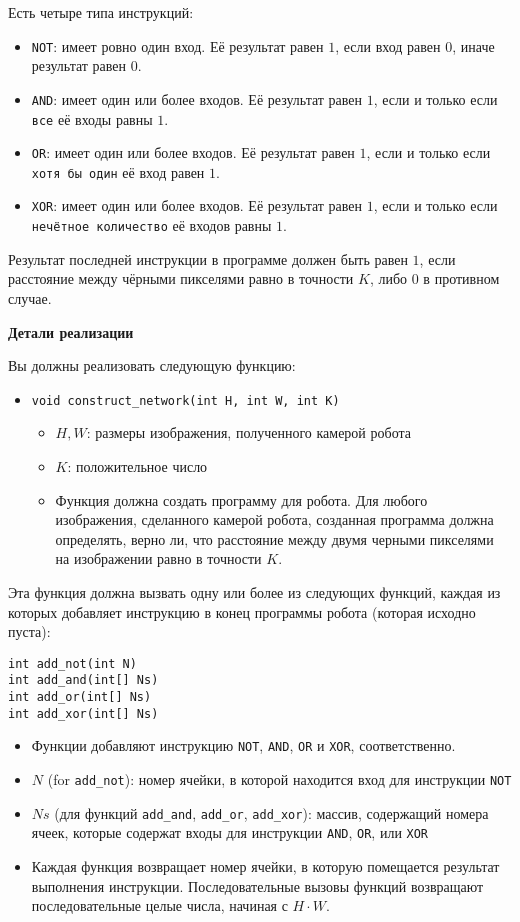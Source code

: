 Есть четыре типа инструкций:
\begin{itemize}
\item \texttt{NOT}: имеет ровно один вход. Её результат равен $1$, если вход равен $0$, иначе результат равен $0$.
\item \texttt{AND}: имеет один или более входов. Её результат равен $1$, если и только если \texttt{все} её входы равны $1$.
\item \texttt{OR}: имеет один или более входов. Её результат равен $1$, если и только если
\texttt{хотя бы один} её вход равен $1$.
\item \texttt{XOR}: имеет один или более входов. Её результат равен $1$, если и только если \texttt{нечётное количество} её входов равны $1$.
\end{itemize}

Результат последней инструкции в программе должен быть равен $1$, если
расстояние между чёрными пикселями равно в точности $K$, либо $0$ в противном
случае.


\textbf{Детали реализации}

Вы должны реализовать следующую функцию:

\begin{itemize}
\item \texttt{void construct\_network(int H, int W, int K)}
\begin{itemize}
\item $H, W$: размеры изображения, полученного камерой робота
\item $K$: положительное число
\item Функция должна создать программу для робота. Для любого изображения,
сделанного камерой робота, созданная программа должна определять, верно
ли, что расстояние между двумя черными пикселями на изображении равно в
точности $K$.
\end{itemize}
\end{itemize}

Эта функция должна вызвать одну или более из следующих функций, каждая из
которых добавляет инструкцию в конец программы робота (которая исходно
пуста):

\begin{verbatim}
int add_not(int N)
int add_and(int[] Ns)
int add_or(int[] Ns)
int add_xor(int[] Ns)
\end{verbatim}

\begin{itemize}
\item Функции добавляют инструкцию \texttt{NOT}, \texttt{AND}, \texttt{OR} и \texttt{XOR}, соответственно.
\item $N$ (for \texttt{add\_not}): номер ячейки, в которой находится вход для
инструкции \texttt{NOT}
\item $Ns$ (для функций \texttt{add\_and}, \texttt{add\_or}, \texttt{add\_xor}): массив, содержащий номера ячеек, которые содержат входы для инструкции \texttt{AND}, \texttt{OR}, или \texttt{XOR}
\item Каждая функция возвращает номер ячейки, в которую помещается результат
выполнения инструкции. Последовательные вызовы функций возвращают последовательные целые числа, начиная с $H \cdot W$.
\end{itemize}

